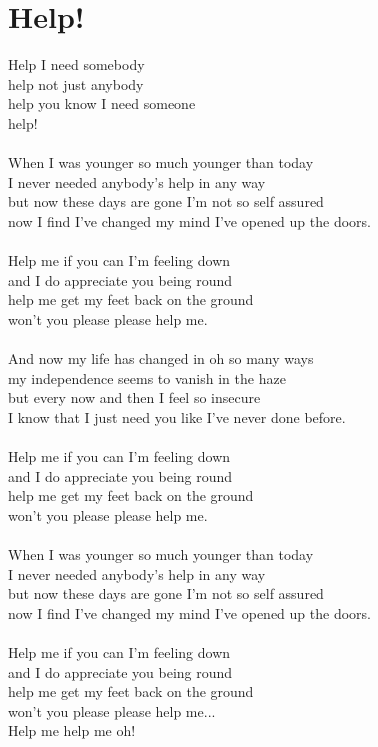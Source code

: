 \section{Help!}
Help I need somebody\\
help not just anybody\\
help you know I need someone\\
help!\\
\\
When I was younger so much younger than today\\
I never needed anybody's help in any way\\
but now these days are gone I'm not so self assured\\
now I find I've changed my mind I've opened up the doors.\\
\\
Help me if you can I'm feeling down\\
and I do appreciate you being round\\
help me get my feet back on the ground\\
won't you please please help me.\\
\\
And now my life has changed in oh so many ways\\
my independence seems to vanish in the haze\\
but every now and then I feel so insecure\\
I know that I just need you like I've never done before.\\
\\
Help me if you can I'm feeling down\\
and I do appreciate you being round\\
help me get my feet back on the ground\\
won't you please please help me.\\
\\
When I was younger so much younger than today\\
I never needed anybody's help in any way\\
but now these days are gone I'm not so self assured\\
now I find I've changed my mind I've opened up the doors.\\
\\
Help me if you can I'm feeling down\\
and I do appreciate you being round\\
help me get my feet back on the ground\\
won't you please please help me...\\
Help me help me oh!\\